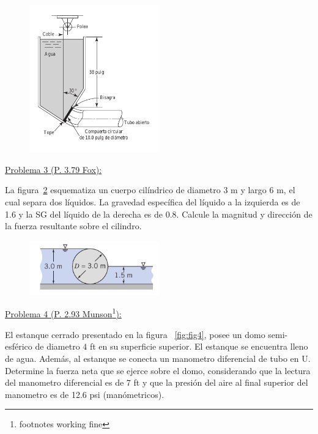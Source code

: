 \documentclass[11pt]{report}
\begin{document}
\begin{figure}[H]
\centering\includegraphics[width=0.5\textwidth]{p2.png}
\caption{\label{fig:fig2} }
\end{figure}

\vspace{0.5cm}
\underline {Problema 3 (P. 3.79 Fox):}
\vspace{0.2cm}

La figura~\ref{fig:fig3} esquematiza un cuerpo cil\'indrico de diametro $3$ m y largo $6$ m, el cual separa dos l\'iquidos. La gravedad espec\'ifica del l\'iquido a la izquierda es de 1.6 y la SG del l\'iquido de la derecha es de 0.8. Calcule la magnitud y direcci\'on de la fuerza resultante sobre el cilindro.

\begin{figure}[H]
\centering\includegraphics[width=0.5\textwidth]{p3.png}
\caption{\label{fig:fig3} }
\end{figure}


\newpage

\vspace{0.5cm}
\underline {Problema 4 (P. 2.93 Munson\footnote{footnotes working fine}):}
\vspace{0.2cm}

El estanque cerrado presentado en la figura ~\ref{fig:fig4}, posee un domo semi-esf\'erico de diametro $4$ ft en su superficie superior. El estanque se encuentra lleno de agua. Adem\'as, al estanque se conecta un manometro diferencial de tubo en U. Determine la fuerza neta que se ejerce sobre el domo, considerando que la lectura del manometro diferencial es de $7$ ft y que la presi\'on del aire al final superior del manometro es de 12.6 psi (man\'ometricos).
\end{document}
